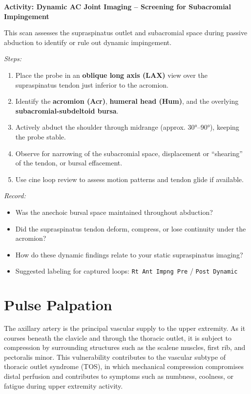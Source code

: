 \begin{labactivitybox}
\textbf{Activity: Dynamic AC Joint Imaging – Screening for Subacromial Impingement}

This scan assesses the supraspinatus outlet and subacromial space during passive abduction to identify or rule out dynamic impingement.

\textit{Steps:}
\begin{enumerate}
  \item Place the probe in an \textbf{oblique long axis (LAX)} view over the supraspinatus tendon just inferior to the acromion.
  \item Identify the \textbf{acromion (Acr)}, \textbf{humeral head (Hum)}, and the overlying \textbf{subacromial-subdeltoid bursa}.
  \item Actively abduct the shoulder through midrange (approx. 30°–90°), keeping the probe stable.
  \item Observe for narrowing of the subacromial space, displacement or “shearing” of the tendon, or bursal effacement.
  \item Use cine loop review to assess motion patterns and tendon glide if available.
\end{enumerate}

\textit{Record:}
\begin{itemize}
  \item Was the anechoic bursal space maintained throughout abduction?
  \item Did the supraspinatus tendon deform, compress, or lose continuity under the acromion?
  \item How do these dynamic findings relate to your static supraspinatus imaging?
  \item Suggested labeling for captured loops: \texttt{Rt Ant Impng Pre} / \texttt{Post Dynamic}
\end{itemize}
\end{labactivitybox}


\section*{Pulse Palpation}

The axillary artery is the principal vascular supply to the upper extremity. As it courses beneath the clavicle and through the thoracic outlet, it is subject to compression by surrounding structures such as the scalene muscles, first rib, and pectoralis minor. This vulnerability contributes to the vascular subtype of thoracic outlet syndrome (TOS), in which mechanical compression compromises distal perfusion and contributes to symptoms such as numbness, coolness, or fatigue during upper extremity activity.

